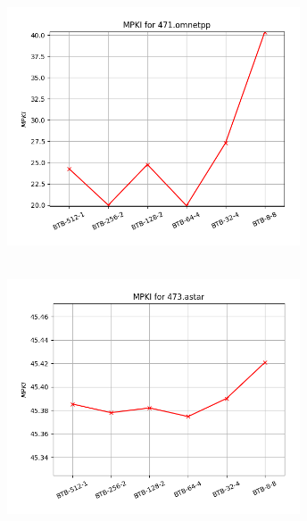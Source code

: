    \begin{minipage}{\textwidth}
      \begin{center}
         \\
         \vspace{3mm}
         \includegraphics[width=0.65\textwidth, frame]{./graphs/4-3/471-omnetpp.png}
         \vspace{6mm}
      \end{center}
   \end{minipage}

   \begin{minipage}{\textwidth}
      \begin{center}
         \\
         \vspace{3mm}
         \includegraphics[width=0.65\textwidth, frame]{./graphs/4-3/473-astar.png}
         \vspace{6mm}
      \end{center}
   \end{minipage}

